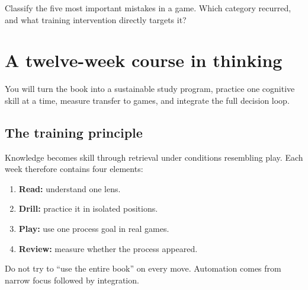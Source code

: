 \begin{exercise}
Classify the five most important mistakes in a game. Which category recurred, and what training intervention directly targets it?
\end{exercise}


\chapter{A twelve-week course in thinking}
\begin{learningbox}
You will turn the book into a sustainable study program, practice one cognitive skill at a time, measure transfer to games, and integrate the full decision loop.
\end{learningbox}

\section{The training principle}
Knowledge becomes skill through retrieval under conditions resembling play. Each week therefore contains four elements:

\begin{enumerate}[label=\textbf{\arabic*.},leftmargin=2em]
\item \textbf{Read:} understand one lens.
\item \textbf{Drill:} practice it in isolated positions.
\item \textbf{Play:} use one process goal in real games.
\item \textbf{Review:} measure whether the process appeared.
\end{enumerate}

Do not try to ``use the entire book'' on every move. Automation comes from narrow focus followed by integration.

